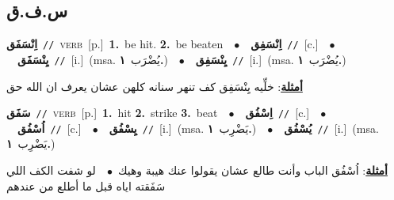 \documentclass[10pt,a4paper,twoside]{article} %
\begin{document}
\begin{multicols}{2}
\vspace{-3mm}
\subsection*{\color{blue}\foreignlanguage{arabic}{س.ف.ق}\color{blue}{}} 

{\setlength\topsep{0pt}\textbf{\foreignlanguage{arabic}{اِنْسَفَق}}\ {\color{gray}\texttt{//}\color{black}}\ \textsc{verb}\ [p.]\ \textbf{1.}~be hit.  \textbf{2.}~be beaten\ \ $\bullet$\ \ \setlength\topsep{0pt}\textbf{\foreignlanguage{arabic}{اِنْسَفِق}}\ {\color{gray}\texttt{//}\color{black}}\ [c.]\ \ $\bullet$\ \ \setlength\topsep{0pt}\textbf{\foreignlanguage{arabic}{يِنْسَفَق}}\ {\color{gray}\texttt{//}\color{black}}\ [i.]\ \color{gray}(msa. \foreignlanguage{arabic}{يُضْرَب}~\foreignlanguage{arabic}{\textbf{١.}})\color{black}\ \ $\bullet$\ \ \setlength\topsep{0pt}\textbf{\foreignlanguage{arabic}{يِنْسَفِق}}\ {\color{gray}\texttt{//}\color{black}}\ [i.]\ \color{gray}(msa. \foreignlanguage{arabic}{يُضْرَب}~\foreignlanguage{arabic}{\textbf{١.}})\color{black}\  \begin{flushright}\color{gray}\foreignlanguage{arabic}{\textbf{\underline{\foreignlanguage{arabic}{أمثلة}}}: خلِّيه يِنْسَفِق كف تنهر سنانه كلهن عشان يعرف ان الله حق}\end{flushright}\color{black}} \vspace{2mm}

{\setlength\topsep{0pt}\textbf{\foreignlanguage{arabic}{سَفَق}}\ {\color{gray}\texttt{//}\color{black}}\ \textsc{verb}\ [p.]\ \textbf{1.}~hit  \textbf{2.}~strike  \textbf{3.}~beat\ \ $\bullet$\ \ \setlength\topsep{0pt}\textbf{\foreignlanguage{arabic}{اِسْفُق}}\ {\color{gray}\texttt{//}\color{black}}\ [c.]\ \ $\bullet$\ \ \setlength\topsep{0pt}\textbf{\foreignlanguage{arabic}{اُسْفُق}}\ {\color{gray}\texttt{//}\color{black}}\ [c.]\ \ $\bullet$\ \ \setlength\topsep{0pt}\textbf{\foreignlanguage{arabic}{يِسْفُق}}\ {\color{gray}\texttt{//}\color{black}}\ [i.]\ \color{gray}(msa. \foreignlanguage{arabic}{يَضْرِب}~\foreignlanguage{arabic}{\textbf{١.}})\color{black}\ \ $\bullet$\ \ \setlength\topsep{0pt}\textbf{\foreignlanguage{arabic}{يُسْفُق}}\ {\color{gray}\texttt{//}\color{black}}\ [i.]\ \color{gray}(msa. \foreignlanguage{arabic}{يَضْرِب}~\foreignlanguage{arabic}{\textbf{١.}})\color{black}\  \begin{flushright}\color{gray}\foreignlanguage{arabic}{\textbf{\underline{\foreignlanguage{arabic}{أمثلة}}}: اُسْفُق الباب وأنت طالع عشان يقولوا عنك هيبة وهيك\ $\bullet$\ \  لو شفت الكف اللي سَفَقته اياه قبل ما أطلع من عندهم}\end{flushright}\color{black}} \vspace{2mm}


\end{multicols}
\end{document}
